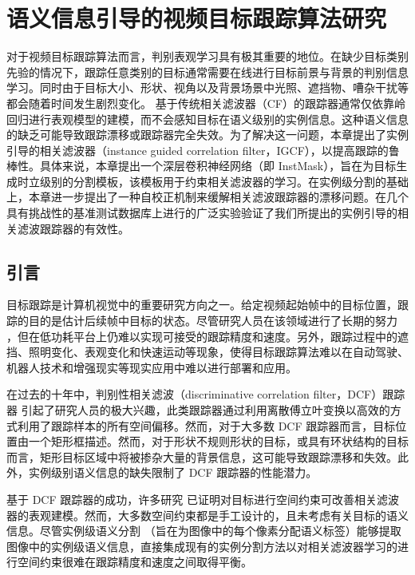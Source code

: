 \chapter{语义信息引导的视频目标跟踪算法研究}\label{chap:IGCF}

对于视频目标跟踪算法而言，判别表观学习具有极其重要的地位。在缺少目标类别先验的情况下，跟踪任意类别的目标通常需要在线进行目标前景与背景的判别信息学习。同时由于目标大小、形状、视角以及背景场景中光照、遮挡物、嘈杂干扰等都会随着时间发生剧烈变化。
基于传统相关滤波器（CF）的跟踪器通常仅依靠岭回归进行表观模型的建模，而不会感知目标在语义级别的实例信息。这种语义信息的缺乏可能导致跟踪漂移或跟踪器完全失效。为了解决这一问题，本章提出了实例引导的相关滤波器（instance guided correlation filter，IGCF），以提高跟踪的鲁棒性。具体来说，本章提出一个深层卷积神经网络（即 InstMask），旨在为目标生成时立级别的分割模板，该模板用于约束相关滤波器的学习。在实例级分割的基础上，本章进一步提出了一种自校正机制来缓解相关滤波跟踪器的漂移问题。在几个具有挑战性的基准测试数据库上进行的广泛实验验证了我们所提出的实例引导的相关滤波跟踪器的有效性。%

\section{引言}
目标跟踪是计算机视觉中的重要研究方向之一。给定视频起始帧中的目标位置，跟踪的目的是估计后续帧中目标的状态。尽管研究人员在该领域进行了长期的努力 \cite{Leang2018OnlineFO, Wang2019VisualOT, Zhang2018UsingFL}，但在低功耗平台上仍难以实现可接受的跟踪精度和速度。另外，跟踪过程中的遮挡、照明变化、表观变化和快速运动等现象，使得目标跟踪算法难以在自动驾驶、机器人技术和增强现实等现实应用中难以进行部署和应用。

在过去的十年中，判别性相关滤波（discriminative correlation filter，DCF）跟踪器 \cite{bolme2010visual,Zhang2018VisualTU} 引起了研究人员的极大兴趣，此类跟踪器通过利用离散傅立叶变换以高效的方式利用了跟踪样本的所有空间偏移。然而，对于大多数 DCF 跟踪器而言，目标位置由一个矩形框描述。然而，对于形状不规则形状的目标，或具有环状结构的目标而言，矩形目标区域中将被掺杂大量的背景信息，这可能导致跟踪漂移和失效。此外，实例级别语义信息的缺失限制了 DCF 跟踪器的性能潜力。

基于 DCF 跟踪器的成功，许多研究 \cite{Danelljan2015LearningSR, Lukezic2017DiscriminativeCF} 已证明对目标进行空间约束可改善相关滤波器的表观建模。然而，大多数空间约束都是手工设计的，且未考虑有关目标的语义信息。尽管实例级语义分割 \cite{Pinheiro2015LearningTS, Zhang2019ProgressivelyDN}（旨在为图像中的每个像素分配语义标签）能够提取图像中的实例级语义信息，直接集成现有的实例分割方法以对相关滤波器学习的进行空间约束很难在跟踪精度和速度之间取得平衡。

